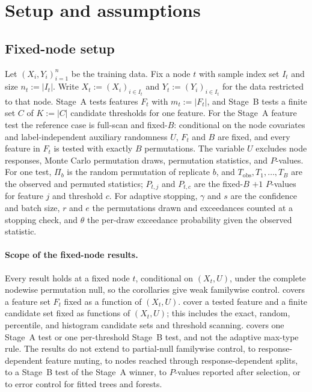 \section{Setup and assumptions}

\subsection{Fixed-node setup}

Let $(X_i, Y_i)_{i=1}^n$ be the training data. Fix a node $t$ with sample index
set $I_t$ and size $n_t:=|I_t|$. Write $X_t := (X_i)_{i\in I_t}$ and
$Y_t := (Y_i)_{i\in I_t}$ for the data restricted to that node. Stage~A tests
features $F_t$ with $m_t:=|F_t|$, and Stage~B tests a finite set $C$ of
$K:=|C|$ candidate thresholds for one feature. For the Stage~A feature test the
reference case is full-scan and fixed-$B$: conditional on the node covariates
and label-independent auxiliary randomness $U$, $F_t$ and $B$ are fixed, and
every feature in $F_t$ is tested with exactly $B$ permutations. The variable
$U$ excludes node responses, Monte Carlo permutation draws, permutation
statistics, and $P$-values. For one test, $\Pi_b$ is the random permutation of
replicate $b$, and $T_{\mathrm{obs}},T_1,\dots,T_B$ are the observed and
permuted statistics; $P_{t,j}$ and $P_{t,c}$ are the fixed-$B$ $+1$ $P$-values
for feature $j$ and threshold $c$. For adaptive stopping, $\gamma$ and $s$ are
the confidence and batch size, $r$ and $e$ the permutations drawn and
exceedances counted at a stopping check, and $\theta$ the per-draw exceedance
probability given the observed statistic.

\paragraph{Scope of the fixed-node results.}\label{app:theory-scope}
Every result holds at a fixed node $t$, conditional on $(X_t,U)$, under the
complete nodewise permutation null, so the corollaries give weak familywise
control.  covers a feature set $F_t$ fixed as a
function of $(X_t,U)$.  cover a
tested feature and a finite candidate set fixed as functions of $(X_t,U)$; this
includes the exact, random, percentile, and histogram candidate sets and
threshold scanning.  covers one Stage~A test or one
per-threshold Stage~B test, and not the adaptive max-type rule. The results do
not extend to partial-null familywise control, to response-dependent feature
muting, to nodes reached through response-dependent splits, to a Stage~B test
of the Stage~A winner, to $P$-values reported after selection, or
to error control for fitted trees and forests.

